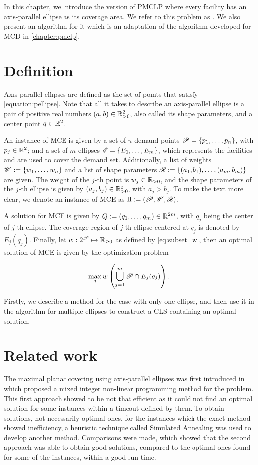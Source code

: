 In this chapter, we introduce the version of PMCLP where every 
facility has an axis-parallel ellipse as its coverage area. We refer to this problem as . We also present an algorithm for it which is an adaptation of the algorithm developed for MCD in \autoref{chapter:pmclp}.

\section{Definition}

Axis-parallel ellipses are defined as the set of points that satisfy \autoref{equation:pellipse}. Note that all it takes to describe an axis-parallel ellipse is a pair of positive real numbers $(a,b) \in \mathbb{R}_{>0}^2$, also called its shape parameters, and a center point $q \in \mathbb{R}^2$.

An instance of MCE is given by a set of $n$ demand points $\mathscr{P} = \{p_1, \dots, p_n\}$, with $p_j\in\mathbb{R}^2$; and a set of $m$ ellipses $\mathscr{E} = \{E_1, \dots, E_m\}$, which represents the facilities and are used to cover the demand set. Additionally, 
a list of weights $\mathscr{W}:=\{w_1, \dots, w_n\}$ and a list of shape parameters $\mathscr{R}:=\{(a_1, b_1), \dots, (a_m, b_m)\}$ are given. The weight of the $j$-th point is $w_j\in\mathbb{R}_{>0}$, and the shape parameters of the $j$-th ellipse is given by $(a_j, b_j)\in\mathbb{R}_{>0}^2$, with $a_j>b_j$.
To make the text more clear, we denote an instance of MCE as $\Pi:=(\mathscr{P}, \mathscr{W}, \mathscr{R})$.

A solution for MCE is given by $Q:=(q_1, \dots, q_m)\in\mathbb{R}^{2m}$, with $q_j$ being the center of $j$-th ellipse. The coverage region of $j$-th ellipse centered at $q_j$ is denoted by $E_j(q_j)$. Finally, let $w : 2^{\mathscr{P}} \mapsto \mathbb{R}_{\ge0}$ as defined by \autoref{eq:subset_w}, then an optimal solution of MCE is given by the optimization problem

\begin{equation}
\max_q w\left(\bigcup_{j=1}^m \mathscr{P} \cap E_j(q_j)\right).
\end{equation}

Firstly, we describe a method for the case with only one ellipse, and then use it in the algorithm for multiple ellipses to construct a CLS containing an optimal solution.

\section{Related work}
The maximal planar covering using axis-parallel ellipses was first introduced in  which proposed a mixed integer non-linear programming method for the problem. This first approach showed to be not that efficient as it could not find an optimal solution for some instances within a timeout defined by them. To obtain solutions, not necessarily optimal ones, for the instances which the exact method showed inefficiency, a heuristic technique called Simulated Annealing was used to develop another method. Comparisons were made, which showed that the second approach was able to obtain good solutions, compared to the optimal ones found for some of the instances, within a good run-time.

